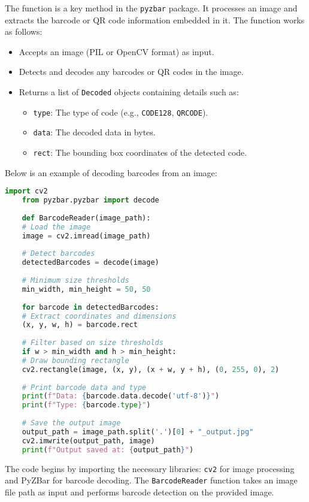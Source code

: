The  function is a key method in the \texttt{pyzbar} package. It processes an image and extracts the barcode or QR code information embedded in it. The function works as follows:
\begin{itemize}
	\item Accepts an image (PIL or OpenCV format) as input.
	\item Detects and decodes any barcodes or QR codes in the image.
	\item Returns a list of \texttt{Decoded} objects containing details such as:
	\begin{itemize}
		\item \texttt{type}: The type of code (e.g., \texttt{CODE128}, \texttt{QRCODE}).
		\item \texttt{data}: The decoded data in bytes.
		\item \texttt{rect}: The bounding box coordinates of the detected code.
	\end{itemize}
\end{itemize}

Below is an example of decoding barcodes from an image:

\begin{lstlisting}[language=Python]
	import cv2
	from pyzbar.pyzbar import decode
	
	def BarcodeReader(image_path):
	# Load the image
	image = cv2.imread(image_path)
	
	# Detect barcodes
	detectedBarcodes = decode(image)
	
	# Minimum size thresholds
	min_width, min_height = 50, 50
	
	for barcode in detectedBarcodes:
	# Extract coordinates and dimensions
	(x, y, w, h) = barcode.rect
	
	# Filter based on size thresholds
	if w > min_width and h > min_height:
	# Draw bounding rectangle
	cv2.rectangle(image, (x, y), (x + w, y + h), (0, 255, 0), 2)
	
	# Print barcode data and type
	print(f"Data: {barcode.data.decode('utf-8')}")
	print(f"Type: {barcode.type}")
	
	# Save the output image
	output_path = image_path.split('.')[0] + "_output.jpg"
	cv2.imwrite(output_path, image)
	print(f"Output saved at: {output_path}")
\end{lstlisting}


The code begins by importing the necessary libraries: \texttt{cv2} for image processing and PyZBar for barcode decoding. The \texttt{BarcodeReader} function takes an image file path as input and performs barcode detection on the provided image.


